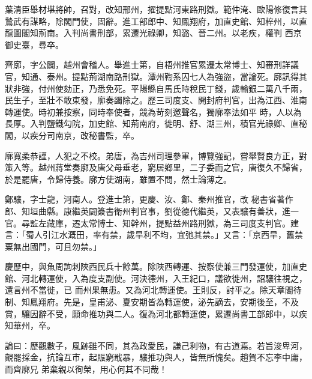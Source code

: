 \begin{pinyinscope}
 葉清臣舉材堪將帥，召對，改知邢州，擢提點河東路刑獄。範仲淹、歐陽修復言其鷙武有謀略，除閣門使，固辭。進工部郎中、知鳳翔府，加直史館、知梓州，以直龍圖閣知荊南。入判尚書刑部，累遷光祿卿，知潞、晉二州。以老疾，權判
 西京御史臺，尋卒。



 齊廓，字公闢，越州會稽人。舉進士第，自梧州推官累遷太常博士、知審刑詳議官，知通、泰州。提點荊湖南路刑獄。潭州鞫系囚七人為強盜，當論死。廓訊得其狀非強，付州使劾正，乃悉免死。平陽縣自馬氏時稅民丁錢，歲輸銀二萬八千兩，民生子，至壯不敢束發，廓奏蠲除之。歷三司度支、開封府判官，出為江西、淮南轉運使。時初兼按察，同時奉使者，競為苛刻邀聲名，獨廓奉法如平
 時，人以為長厚。入判鹽鐵勾院，加史館、知荊南府，徙明、舒、湖三州，積官光祿卿、直秘閣，以疾分司南京，改秘書監，卒。



 廓寬柔恭謹，人犯之不校。弟唐，為吉州司理參軍，博覽強記，嘗舉賢良方正，對策入等。越州蔣堂奏廓及唐父母垂老，窮居鄉里，二子委而之官，唐復久不歸省，於是罷唐，令歸侍養。廓方使湖南，雖置不問，然士論薄之。



 鄭驤，字士龍，河南人。登進士第，更慶、汝、鄭、秦州推官，改
 秘書省著作郎、知垣曲縣。康繼英闢簽書衛州判官事，劉從德代繼英，又表驤有善狀，進一官。尋監左藏庫，遷太常博士、知幹州，提點益州路刑獄，為三司度支判官。建言：「蜀人引江水溉田，率有禁，歲旱利不均，宜弛其禁。」又言：「京西旱，舊禁粟無出國門，可且勿禁。」



 慶歷中，與魚周詢刺陜西民兵十餘萬。除陜西轉運、按察使兼三門發運使，加直史館、河北轉運使，入為度支副使。河決德州，入王紀口，議欲徙州，詔驤往視之，還言州不當徙，已
 而州果無患。又為河北轉運使。王則反，討平之。除天章閣待制、知鳳翔府。先是，皇甫泌、夏安期皆為轉運使，泌先謫去，安期後至，不及賞，驤因辭不受，願命推功與二人。復為河北都轉運使，累遷尚書工部郎中，以疾知華州，卒。



 論曰：歷觀數子，風跡雖不同，其為政愛民，謙己利物，有古道焉。若旨浚卑河，覿罷採金，抗論互市，起賑窮戢暴，驤推功與人，皆無所愧矣。趙賀不忘李中庸，而齊廓兄
 弟棄親以徇榮，用心何其不同哉！



\end{pinyinscope}